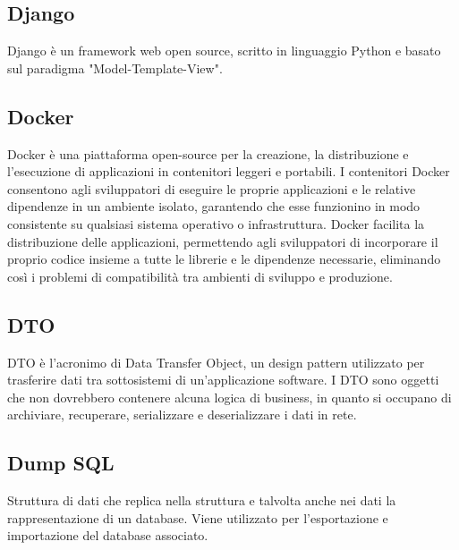 \vspace{2em}
\subsection*{Django}
\par Django è un framework web open source, scritto in linguaggio Python e basato sul paradigma "Model-Template-View".

\vspace{2em}
\subsection*{Docker}
\par Docker è una piattaforma open-source per la creazione, la distribuzione e l'esecuzione di applicazioni in contenitori leggeri e portabili. I contenitori Docker consentono agli sviluppatori di eseguire le proprie applicazioni e le relative dipendenze in un ambiente isolato, garantendo che esse funzionino in modo consistente su qualsiasi sistema operativo o infrastruttura. Docker facilita la distribuzione delle applicazioni, permettendo agli sviluppatori di incorporare il proprio codice insieme a tutte le librerie e le dipendenze necessarie, eliminando così i problemi di compatibilità tra ambienti di sviluppo e produzione.

\vspace{2em}
\subsection*{DTO}
\par DTO è l'acronimo di Data Transfer Object, un design pattern utilizzato per trasferire dati tra sottosistemi di un'applicazione software. I DTO sono oggetti che non dovrebbero contenere alcuna logica di business, in quanto si occupano di archiviare, recuperare, serializzare e deserializzare i dati in rete.

\vspace{2em}
\subsection*{Dump SQL}
\par Struttura di dati che replica nella struttura e talvolta anche nei dati la rappresentazione di un database. Viene utilizzato per l'esportazione e importazione del database associato.
